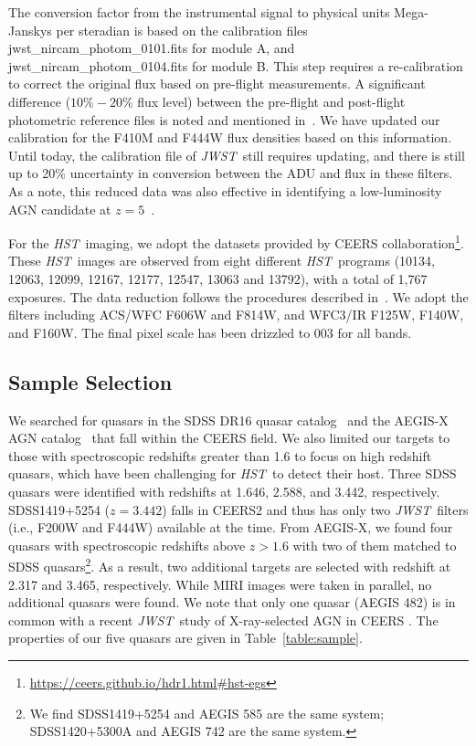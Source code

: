 \documentclass[twocolumn,]{aastex631}
\newcommand{\hst}{{\it HST}}
\newcommand{\jwst}{{\it JWST}}
\begin{document}
The conversion factor from the instrumental signal to physical units Mega-Janskys per steradian is based on the calibration files \textsf{jwst\_nircam\_photom\_0101.fits} for module A, and \textsf{jwst\_nircam\_photom\_0104.fits} for module B. This step requires a re-calibration to correct the original flux based on pre-flight measurements. A significant difference ($10\%-20\%$ flux level) between the pre-flight and post-flight photometric reference files is noted and mentioned in~\citet{Adams22}. We have updated our calibration for the F410M and F444W flux densities based on this information. Until today, the calibration file of \jwst\ still requires updating, and there is still up
to 20\% uncertainty in conversion between the ADU and flux in these filters. As a note, this reduced data was also effective in identifying a low-luminosity AGN candidate at $z=5$~\citep{2022arXiv220907325O}.

For the \hst\ imaging, we adopt the datasets provided by CEERS collaboration\footnote{\url{https://ceers.github.io/hdr1.html\#hst-egs}}. These \hst\ images are observed from eight different \hst\ programs (10134, 12063, 12099, 12167, 12177, 12547, 13063 and 13792), with a total of 1,767 exposures. The data reduction follows the procedures described in~\citet{Koekemoer2011}. We adopt the filters including ACS/WFC F606W and F814W, and WFC3/IR F125W, F140W, and F160W. The final pixel scale has been drizzled to 0\farcs{}03 for all bands.


\subsection{Sample Selection}
We searched for quasars in the SDSS DR16 quasar catalog~\citep{2020ApJS..250....8L} and the AEGIS-X AGN catalog~\citep{2009ApJS..180..102L, Nandra2015} that fall within the CEERS field. We also limited our targets to those with spectroscopic redshifts greater than 1.6 to focus on high redshift quasars, which have been challenging for \hst\ to detect their host. Three SDSS quasars were identified with redshifts at 1.646, 2.588, and 3.442, respectively. SDSS1419+5254 ($z=3.442$) falls in CEERS2 and thus has only two \jwst\ filters (i.e., F200W and F444W) available at the time. From AEGIS-X, we found four quasars with spectroscopic redshifts above $z>1.6$ with two of them matched to SDSS quasars\footnote{We find SDSS1419+5254 and AEGIS 585 are the same system;  SDSS1420+5300A and AEGIS 742 are the same system.}. As a result, two additional targets are selected with redshift at 2.317 and 3.465, respectively. While MIRI images were taken in parallel, no additional quasars were found. We note that only one quasar (AEGIS 482) is in common with a recent \jwst\ study of X-ray-selected AGN in CEERS \citep{Kocevski2022}. The properties of our five quasars are given in Table~\ref{table:sample}.
\end{document}
